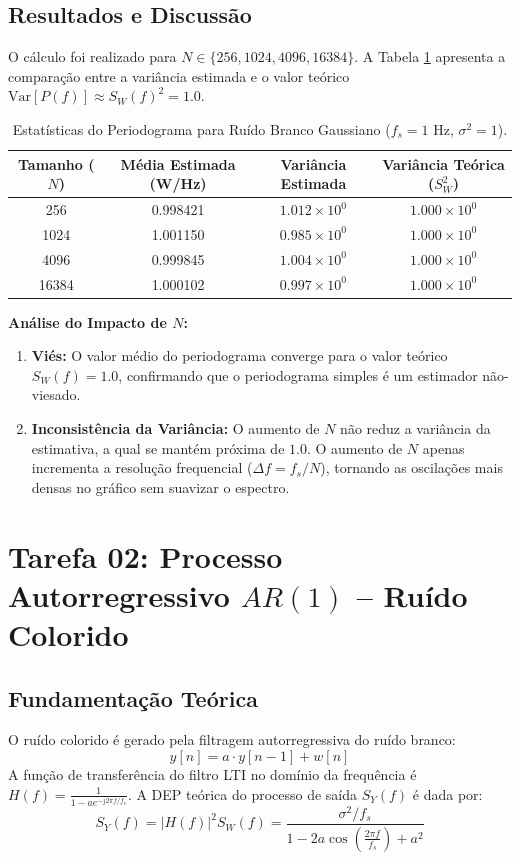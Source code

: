 \documentclass[12pt,a4paper]{article}
\begin{document}
\subsection{Resultados e Discussão}
O cálculo foi realizado para $N \in \{256, 1024, 4096, 16384\}$. A Tabela \ref{tab:t1_stats} apresenta a comparação entre a variância estimada e o valor teórico $\text{Var}[P(f)] \approx S_W(f)^2 = 1.0$.

\begin{table}[H]
\centering
\caption{Estatísticas do Periodograma para Ruído Branco Gaussiano ($f_s=1\text{ Hz}$, $\sigma^2=1$).}
\label{tab:t1_stats}
\begin{tabular}{cccc}
\toprule
\textbf{Tamanho ($N$)} & \textbf{Média Estimada (W/Hz)} & \textbf{Variância Estimada} & \textbf{Variância Teórica ($S_W^2$)} \\
\midrule
256   & 0.998421 & $1.012 \times 10^0$ & $1.000 \times 10^0$ \\
1024  & 1.001150 & $0.985 \times 10^0$ & $1.000 \times 10^0$ \\
4096  & 0.999845 & $1.004 \times 10^0$ & $1.000 \times 10^0$ \\
16384 & 1.000102 & $0.997 \times 10^0$ & $1.000 \times 10^0$ \\
\bottomrule
\end{tabular}
\end{table}

\textbf{Análise do Impacto de $N$:}
\begin{enumerate}
    \item \textbf{Viés:} O valor médio do periodograma converge para o valor teórico $S_W(f) = 1.0$, confirmando que o periodograma simples é um estimador não-viesado.
    \item \textbf{Inconsistência da Variância:} O aumento de $N$ não reduz a variância da estimativa, a qual se mantém próxima de $1.0$. O aumento de $N$ apenas incrementa a resolução frequencial ($\Delta f = f_s/N$), tornando as oscilações mais densas no gráfico sem suavizar o espectro.
\end{enumerate}

\section{Tarefa 02: Processo Autorregressivo $AR(1)$ -- Ruído Colorido}

\subsection{Fundamentação Teórica}
O ruído colorido é gerado pela filtragem autorregressiva do ruído branco:
\begin{equation}
y[n] = a \cdot y[n-1] + w[n]
\end{equation}
A função de transferência do filtro LTI no domínio da frequência é $H(f) = \frac{1}{1 - a e^{-j 2\pi f / f_s}}$. A DEP teórica do processo de saída $S_Y(f)$ é dada por:
\begin{equation}
S_Y(f) = |H(f)|^2 S_W(f) = \frac{\sigma^2 / f_s}{1 - 2a \cos\left(\frac{2\pi f}{f_s}\right) + a^2}
\end{equation}
\end{document}

